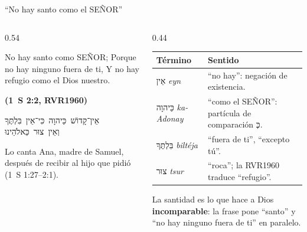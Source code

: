 \documentclass[hyperref={bookmarks=false},aspectratio=169]{beamer}
\newcommand{\heb}[1]{\mbox{\foreignlanguage{hebrew}{#1}}}
\newcommand{\SENOR}{S{\fontsize{0.78em}{1em}\selectfont EÑOR}}
\newcommand{\fuente}[1]{\par\hfill{\upshape\bfseries\footnotesize\textcolor{azul}{#1}}}
\newcommand{\destacar}[1]{\textbf{\textcolor{azul}{#1}}}
\begin{document}
\begin{frame}{``No hay santo como el \SENOR''}
\begin{columns}[c,onlytextwidth]
\begin{column}{0.54\textwidth}
\begin{cita}No hay santo como \SENOR; Porque no hay ninguno fuera de ti, Y no hay refugio como el Dios nuestro.\fuente{(1~S 2:2, RVR1960)}\end{cita}
\begin{center}\heb{אֵין־קָדוֹשׁ כַּיהוָה כִּי־אֵין בִּלְתֶּךָ}\\ \heb{וְאֵין צוּר כֵּאלֹהֵינוּ}\end{center}
\small Lo canta Ana, madre de Samuel, después de recibir al hijo que pidió (1~S 1:27--2:1).
\end{column}
\begin{column}{0.44\textwidth}\scriptsize
\renewcommand{\arraystretch}{1.2}
\begin{tabular}{@{}>{\RaggedRight\arraybackslash}p{1.8cm}>{\RaggedRight\arraybackslash}p{3.6cm}@{}}
\toprule
\textbf{Término} & \textbf{Sentido} \\ \midrule
\heb{אֵין} \emph{eyn} & ``no hay'': negación de existencia. \\
\heb{כַּיהוָה} \emph{ka-Adonay} & ``como el \SENOR'': partícula de comparación \heb{כְּ}. \\
\heb{בִּלְתֶּךָ} \emph{biltéja} & ``fuera de ti'', ``excepto tú''. \\
\heb{צוּר} \emph{tsur} & ``roca''; la RVR1960 traduce ``refugio''. \\
\bottomrule
\end{tabular}\par\medskip
\small La santidad es lo que hace a Dios \destacar{incomparable}: la frase pone ``santo'' y ``no hay ninguno fuera de ti'' en paralelo.
\end{column}
\end{columns}
\end{frame}
\end{document}
